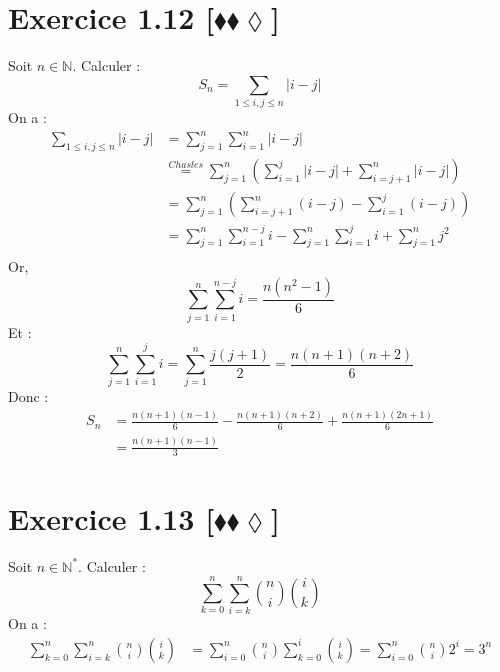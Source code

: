 \documentclass[10pt]{article}
\begin{document}
\section*{Exercice 1.12 [$\blacklozenge\blacklozenge\lozenge$]}
\begin{tcolorbox}[enhanced, width=6in, center, size=fbox, fontupper=\large, drop shadow southwest]
    Soit $n\in\mathbb{N}$. Calculer :
    \begin{equation*}
        S_n = \sum\limits_{1\leq i,j\leq n}{|i-j|}
    \end{equation*}
    On a :
    \begin{align*}
        \sum\limits_{1\leq i,j\leq n}{|i-j|}
        &=\sum\limits^{n}_{j=1}{\sum\limits^{n}_{i=1}{|i-j|}}\\
        &\stackrel{Chasles}{=}\sum\limits^{n}_{j=1}{\left(\sum\limits^{j}_{i=1}{|i-j|}+\sum\limits^{n}_{i=j+1}{|i-j|}\right)}\\
        &=\sum\limits^{n}_{j=1}{\left(\sum\limits^{n}_{i=j+1}{(i-j)}-\sum\limits^{j}_{i=1}{(i-j)}\right)}\\
        &=\sum\limits^{n}_{j=1}{\sum\limits^{n-j}_{i=1}{i}-\sum\limits^{n}_{j=1}\sum\limits^{j}_{i=1}{i}+\sum\limits^n_{j=1}j^2}\\
    \end{align*}
    Or,
    \begin{equation*}
        \sum^n_{j=1}{\sum^{n-j}_{i=1}{i}}=\frac{n(n^2-1)}{6}
    \end{equation*}
    Et :
    \begin{equation*}
        \sum^n_{j=1}\sum^j_{i=1}{i}=\sum^n_{j=1}{\frac{j(j+1)}{2}}=\frac{n(n+1)(n+2)}{6}
    \end{equation*}
    Donc :
    \begin{align*}
        S_n &= \frac{n(n+1)(n-1)}{6} - \frac{n(n+1)(n+2)}{6} + \frac{n(n+1)(2n+1)}{6}\\
            &= \frac{n(n+1)(n-1)}{3}
    \end{align*}
\end{tcolorbox}

\section*{Exercice 1.13 [$\blacklozenge\blacklozenge\lozenge$]}
\begin{tcolorbox}[enhanced, width=6in, center, size=fbox, fontupper=\large, drop shadow southwest]
    Soit $n\in\mathbb{N}^*$. Calculer :
    \begin{equation*}
        \sum^n_{k=0}\sum^n_{i=k}{\binom{n}{i}\binom{i}{k}}
    \end{equation*}
    On a :
    \begin{align*}
        \sum^n_{k=0}\sum^n_{i=k}{\binom{n}{i}\binom{i}{k}}&=\sum^n_{i=0}\binom{n}{i}\sum^i_{k=0}\binom{i}{k}=\sum^n_{i=0}\binom{n}{i}2^i=3^n
    \end{align*}
\end{tcolorbox}
\end{document}

